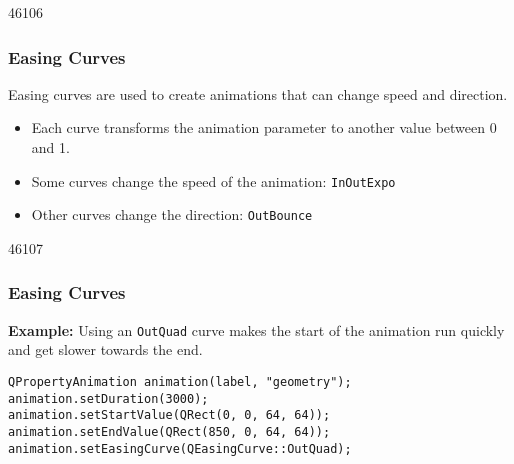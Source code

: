 \begin{slide}[fragile]{46106}\frametitle{Easing Curves}
Easing curves are used to create animations that can change speed and direction.

\vspace*{1.5em}

\begin{itemize}
\item Each curve transforms the animation parameter to another
value between 0 and 1.
\item Some curves change the speed of the animation: \texttt{InOutExpo}
\item Other curves change the direction: \texttt{OutBounce}
\end{itemize}

\end{slide}

\begin{slide}[fragile]{46107}\frametitle{Easing Curves}
\textbf{Example:} Using an \texttt{OutQuad} curve makes the start of the
animation run quickly and get slower towards the end.

\vspace*{1.5em}

\small
\begin{lstlisting}
QPropertyAnimation animation(label, "geometry");
animation.setDuration(3000);
animation.setStartValue(QRect(0, 0, 64, 64));
animation.setEndValue(QRect(850, 0, 64, 64));
animation.setEasingCurve(QEasingCurve::OutQuad);
\end{lstlisting}
\normalsize
{}
\end{slide}


